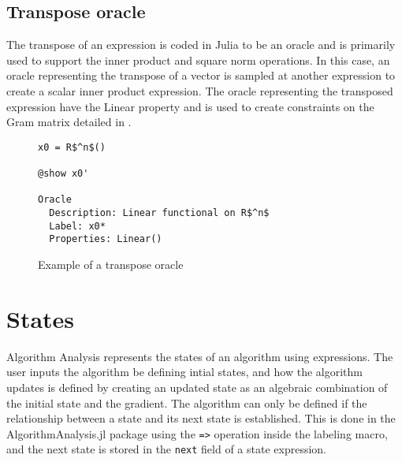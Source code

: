 
\subsection*{Transpose oracle}

The transpose of an expression is coded in Julia to be an oracle and is primarily used to support the inner product and square norm operations. In this case, an oracle representing the transpose of a vector is sampled at another expression to create a scalar inner product expression. The oracle representing the transposed expression have the Linear property and is used to create constraints on the Gram matrix detailed in .

\begin{figure}[h!]
	\begin{lstlisting}[mathescape]
x0 = R$^n$()

@show x0'

Oracle
  Description: Linear functional on R$^n$
  Label: x0*
  Properties: Linear()
\end{lstlisting}
\caption{Example of a transpose oracle}
\label{ex_transposeoracle}
\end{figure}

\section{States} \label{states}
Algorithm Analysis represents the states of an algorithm using expressions. The user inputs the algorithm be defining intial states, and how the algorithm updates is defined by creating an updated state as an algebraic combination of the initial state and the gradient. The algorithm can only be defined if the relationship between a state and its next state is established. This is done in the AlgorithmAnalysis.jl package using the \texttt{=>} operation inside the labeling macro, and the next state is stored in the \texttt{next} field of a state expression.

